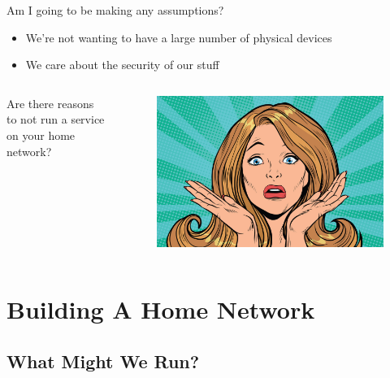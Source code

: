 \documentclass{beamer}
\begin{document}
\begin{frame}
    Am I going to be making any assumptions?
    \begin{itemize}
        \item We're not wanting to have a large number of physical devices 
        \item We care about the security of our stuff
    \end{itemize}
\end{frame}

\begin{frame}
    \begin{columns}
        \begin{column}{0.5\textwidth}
            Are there reasons to not run a service on your home network?
        \end{column}
        \begin{column}{0.5\textwidth}
            \begin{figure}
                \centering
                \includegraphics[width=\textwidth,keepaspectratio]{../resources/confusion.jpg}
            \end{figure}
        \end{column}
    \end{columns}
\end{frame}

\section{Building A Home Network}
\subsection{What Might We Run?}
\end{document}
